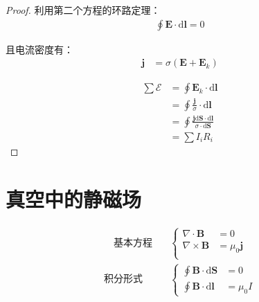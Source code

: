 \documentclass[12pt,onecolumn,a4paper]{book}
\newenvironment{block}[1]{
    \begin{tcolorbox}[colback=blue!5!white,colframe=blue!75!black,title=#1]
}{
    \end{tcolorbox}
}
\numberwithin{table}{subsection}
\numberwithin{equation}{subsection}
\begin{document}
\begin{proof}
    利用第二个方程的环路定理：
    \begin{align}
        \oint \mathbf{E} \cdot \mathrm{d} \mathbf{l}  =0
    \end{align}

    且电流密度有：
    \begin{align}
        \mathbf{j} & = \sigma (\mathbf{E}+\mathbf{E}_k)
    \end{align}

    \begin{align}
        \sum \mathcal{E} & = \oint \mathbf{E}_k \cdot \mathrm{d} \mathbf{l}                                                                 \\
                         & = \oint \frac{\mathbf{j}}{\sigma} \cdot \mathrm{d} \mathbf{l}                                                    \\
                         & = \oint \frac{\mathbf{j} \mathrm{d} \mathbf{S} \cdot \mathrm{d} \mathbf{l} }{\sigma \cdot \mathrm{d} \mathbf{S}} \\
                         & = \sum I_iR_i
    \end{align}
\end{proof}

\chapter{真空中的静磁场}

\begin{block}{方程}
    \begin{align}
        \quad
        \text{基本方程} \quad & \left\{
        \begin{aligned}
            \nabla \cdot \mathbf{B}  & = 0                \\
            \nabla \times \mathbf{B} & = \mu_0 \mathbf{j} \\
        \end{aligned}
        \right.                     \\
        \text{积分形式} \quad
                          & \left\{
        \begin{aligned}
            \oint \mathbf{B} \cdot \mathrm{d} \mathbf{S} & = 0       \\
            \oint \mathbf{B} \cdot \mathrm{d} \mathbf{l} & = \mu_0 I
        \end{aligned}
        \right.
    \end{align}
\end{block}
\end{document}
